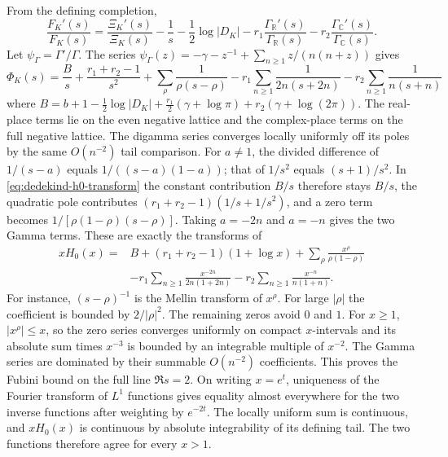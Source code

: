 \documentclass[11pt]{amsart}
\theoremstyle{definition}
\theoremstyle{remark}
\numberwithin{equation}{section}
\begin{document}
From the defining completion,
\[
 \frac{F_K'(s)}{F_K(s)}
 =\frac{\Xi_K'(s)}{\Xi_K(s)}-\frac1s-\frac12\log|D_K|
  -r_1\frac{\Gamma_{\mathbb R}'(s)}{\Gamma_{\mathbb R}(s)}
  -r_2\frac{\Gamma_{\mathbb C}'(s)}{\Gamma_{\mathbb C}(s)} .
\]
Let \(\psi_\Gamma=\Gamma'/\Gamma\). The series
\(\psi_\Gamma(z)=-\gamma-z^{-1}
 +\sum_{n\geq1}z/(n(n+z))\) gives
\[
 \Phi_K(s)=\frac{B}{s}+\frac{r_1+r_2-1}{s^2}
  +\sum_\rho\frac{1}{\rho(s-\rho)}
  -r_1\sum_{n\geq1}\frac{1}{2n(s+2n)}
  -r_2\sum_{n\geq1}\frac{1}{n(s+n)}
\]
where \(B=b+1-\tfrac12\log|D_K|+\tfrac{r_1}{2}(\gamma+\log\pi)
+r_2(\gamma+\log(2\pi))\). The real-place terms lie on
the even negative lattice and the complex-place terms on the full
negative lattice. The digamma series converges locally uniformly
off its poles by the same \(O(n^{-2})\) tail comparison.
For \(a\ne1\), the divided difference of \(1/(s-a)\) equals
\(1/((s-a)(1-a))\); that of \(1/s^2\) equals \((s+1)/s^2\).
In \eqref{eq:dedekind-h0-transform} the constant contribution
\(B/s\) therefore stays \(B/s\), the quadratic pole contributes
\((r_1+r_2-1)(1/s+1/s^2)\), and a zero term becomes
\(1/[\rho(1-\rho)(s-\rho)]\). Taking \(a=-2n\) and \(a=-n\)
gives the two Gamma terms. These are exactly the transforms of
\begin{align}
 xH_0(x)={}& B+(r_1+r_2-1)(1+\log x)
       +\sum_\rho\frac{x^\rho}{\rho(1-\rho)}
 \nonumber\\
 &-r_1\sum_{n\geq1}\frac{x^{-2n}}{2n(1+2n)}
  -r_2\sum_{n\geq1}\frac{x^{-n}}{n(1+n)} .
 \label{eq:dedekind-h0-series}
\end{align}
For instance, \((s-\rho)^{-1}\) is the Mellin transform of \(x^\rho\).
For large \(|\rho|\) the coefficient is bounded by \(2/|\rho|^2\).
The remaining zeros avoid \(0\) and \(1\). For \(x\ge1\),
\(|x^\rho|\le x\), so the zero series converges uniformly on
compact \(x\)-intervals and its absolute sum times \(x^{-3}\)
is bounded by an integrable multiple of \(x^{-2}\).
The Gamma series are dominated by their summable \(O(n^{-2})\)
coefficients. This proves the Fubini bound on the full line
\(\Re s=2\). On writing \(x=e^t\), uniqueness of the Fourier
transform of \(L^1\) functions gives equality almost everywhere
for the two inverse functions after weighting by \(e^{-2t}\).
The locally uniform sum is continuous, and \(xH_0(x)\) is
continuous by absolute integrability of its defining tail.
The two functions therefore agree for every \(x>1\).
\end{document}
